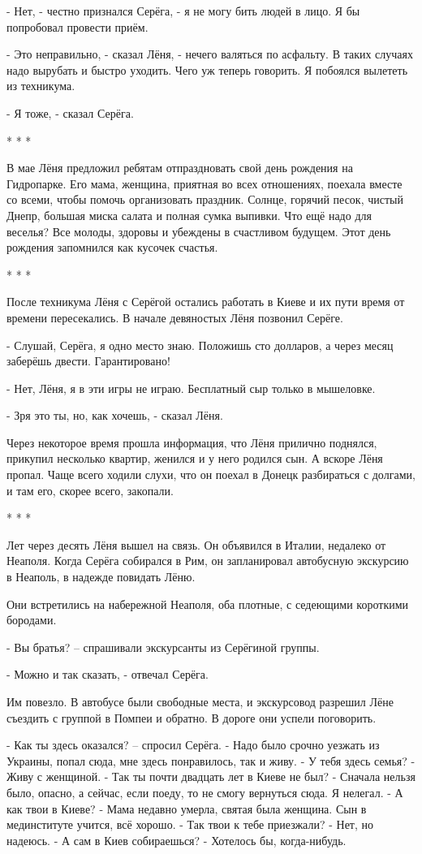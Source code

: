 - Нет, - честно признался Серёга, - я не могу бить людей в лицо. Я бы
попробовал провести приём.

- Это неправильно, - сказал Лёня, - нечего валяться по асфальту. В таких
случаях надо вырубать и быстро уходить. Чего уж теперь говорить. Я побоялся
вылететь из техникума.

- Я тоже, - сказал Серёга.

* * *

В мае Лёня предложил ребятам отпраздновать свой день рождения на Гидропарке.
Его мама, женщина, приятная во всех отношениях, поехала вместе со всеми, чтобы
помочь организовать праздник. Солнце, горячий песок, чистый Днепр, большая
миска салата и полная сумка выпивки. Что ещё надо для веселья? Все молоды,
здоровы и убеждены в счастливом будущем. Этот день рождения запомнился как
кусочек счастья.

* * *

После техникума Лёня с Серёгой остались работать в Киеве и их пути время от
времени пересекались. В начале девяностых Лёня позвонил Серёге.

- Слушай, Серёга, я одно место знаю. Положишь сто долларов, а через месяц
заберёшь двести. Гарантировано!

- Нет, Лёня, я в эти игры не играю. Бесплатный сыр только в мышеловке.

- Зря это ты, но, как хочешь, - сказал Лёня.

Через некоторое время прошла информация, что Лёня прилично поднялся, прикупил
несколько квартир, женился и у него родился сын. А вскоре Лёня пропал. Чаще
всего ходили слухи, что он поехал в Донецк разбираться с долгами, и там его,
скорее всего, закопали.

* * *

Лет через десять Лёня вышел на связь. Он объявился в Италии, недалеко от
Неаполя. Когда Серёга собирался в Рим, он запланировал автобусную экскурсию в
Неаполь, в надежде повидать Лёню.

Они встретились на набережной Неаполя, оба плотные, с седеющими короткими
бородами.

- Вы братья? – спрашивали экскурсанты из Серёгиной группы.

- Можно и так сказать, - отвечал Серёга.

Им повезло. В автобусе были свободные места, и экскурсовод разрешил Лёне
съездить с группой в Помпеи и обратно. В дороге они успели поговорить.

\obeycr
- Как ты здесь оказался? – спросил Серёга.
- Надо было срочно уезжать из Украины, попал сюда, мне здесь понравилось, так и живу.
- У тебя здесь семья?
- Живу с женщиной.
- Так ты почти двадцать лет в Киеве не был?
- Сначала нельзя было, опасно, а сейчас, если поеду, то не смогу вернуться сюда. Я нелегал.
- А как твои в Киеве?
- Мама недавно умерла, святая была женщина. Сын в мединституте учится, всё хорошо.
- Так твои к тебе приезжали?
- Нет, но надеюсь.
- А сам в Киев собираешься?
- Хотелось бы, когда-нибудь.
\restorecr

